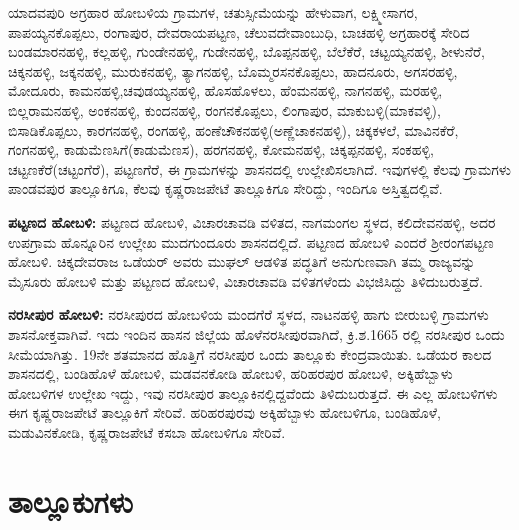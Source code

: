 ಯಾದವಪುರಿ ಅಗ್ರಹಾರ ಹೋಬಳಿಯ ಗ್ರಾಮಗಳ, ಚತುಸ್ಸೀಮೆಯನ್ನು ಹೇಳುವಾಗ, ಲಕ್ಷ್ಮೀಸಾಗರ, ಪಾಪಯ್ಯನ\-ಕೊಪ್ಪಲು, ರಂಗಾಪುರ, ದೇವರಾಯಪಟ್ಟಣ, ಚೆಲುವದೇವಾಂಬುಧಿ, ಬಾಚಹಳ್ಳಿ ಅಗ್ರಹಾರಕ್ಕೆ ಸೇರಿದ ಬಂಡಮಾರನಹಳ್ಳಿ, ಕಲ್ಲಹಳ್ಳಿ, ಗುಂಡೇನಹಳ್ಳಿ, ಗುಡೇನಹಳ್ಳಿ, ಬೊಪ್ಪನಹಳ್ಳಿ, ಬೆಲೆಕೆರೆ, ಚಟ್ಟಯ್ಯನಹಳ್ಳಿ, ಶೀಳುನೆರೆ, ಚಿಕ್ಕನಹಳ್ಳಿ, ಜಕ್ಕನಹಳ್ಳಿ, ಮುರುಕನಹಳ್ಳಿ, ತ್ಯಾಗನಹಳ್ಳಿ, ಬೊಮ್ಮರಸನಕೊಪ್ಪಲು, ಹಾದನೂರು, ಅಗಸರಹಳ್ಳಿ, ಮೋದೂರು, ಕಾಮನಹಳ್ಳಿ,\break ಚವುಡಯ್ಯನಹಳ್ಳಿ, ಹೊಸಹೊಳಲು, ಹೆಂಮನಹಳ್ಳಿ, ನಾಗನಹಳ್ಳಿ, ಮರಹಳ್ಳಿ, ಬಿಲ್ಲರಾಮನಹಳ್ಳಿ, ಅಂಕನಹಳ್ಳಿ, ಕುಂದನಹಳ್ಳಿ, ರಂಗನಕೊಪ್ಪಲು, ಲಿಂಗಾಪುರ, ಮಾಕುಬಳ್ಳಿ(ಮಾಕವಳ್ಳಿ), ಬಿಸಾಡಿಕೊಪ್ಪಲು, ಕಾರಗನಹಳ್ಳಿ, ರಂಗಹಳ್ಳಿ, ಹಂಣೆಚೌಕನ\-ಹಳ್ಳಿ\break (ಅಣ್ಣೆಚಾಕನಹಳ್ಳಿ), ಚಿಕ್ಕಕಳಲೆ, ಮಾವಿನಕೆರೆ, ಗಂಗನಹಳ್ಳಿ, ಕಾಡುಮೆಣಸಿಗೆ(ಕಾಡುಮೆಣಸ), ಹರಗನಹಳ್ಳಿ, ಕೋಮನಹಳ್ಳಿ, ಚಿಕ್ಕಪ್ಪನಹಳ್ಳಿ, ಸಂಕಹಳ್ಳಿ, ಚಟ್ಟಣಕೆರೆ(ಚಟ್ಟಂಗೆರೆ), ಪಟ್ಟಣಗೆರೆ, ಈ ಗ್ರಾಮಗಳನ್ನು ಶಾಸನದಲ್ಲಿ ಉಲ್ಲೇಖಿಸಲಾಗಿದೆ. ಇವುಗಳಲ್ಲಿ ಕೆಲವು ಗ್ರಾಮಗಳು ಪಾಂಡವಪುರ ತಾಲ್ಲೂಕಿಗೂ, ಕೆಲವು ಕೃಷ್ಣರಾಜಪೇಟೆ ತಾಲ್ಲೂಕಿಗೂ ಸೇರಿದ್ದು, ಇಂದಿಗೂ ಅಸ್ತಿತ್ವದಲ್ಲಿವೆ.

\textbf{ಪಟ್ಟಣದ ಹೋಬಳಿ:} ಪಟ್ಟಣದ ಹೋಬಳಿ, ವಿಚಾರಚಾವಡಿ ವಳಿತದ, ನಾಗಮಂಗಲ ಸ್ಥಳದ, ಕಲಿದೇವನಹಳ್ಳಿ, ಅದರ ಉಪಗ್ರಾಮ ಹೊನ್ನೂರಿನ ಉಲ್ಲೇಖ ಮುದಗುಂದೂರು ಶಾಸನದಲ್ಲಿದೆ. ಪಟ್ಟಣದ ಹೋಬಳಿ ಎಂದರೆ ಶ‍್ರೀರಂಗಪಟ್ಟಣ ಹೋಬಳಿ. ಚಿಕ್ಕದೇವರಾಜ ಒಡೆಯರ್​ ಅವರು ಮುಘಲ್​ ಆಡಳಿತ ಪದ್ಧತಿಗೆ ಅನುಗುಣವಾಗಿ ತಮ್ಮ ರಾಜ್ಯವನ್ನು ಮೈಸೂರು ಹೋಬಳಿ ಮತ್ತು ಪಟ್ಟಣದ ಹೋಬಳಿ, ವಿಚಾರಚಾವಡಿ ವಳಿತಗಳೆಂದು ವಿಭಜಿಸಿದ್ದು ತಿಳಿದುಬರುತ್ತದೆ.

\textbf{ನರಸೀಪುರ ಹೋಬಳಿ:} ನರಸೀಪುರದ ಹೋಬಳಿಯ ಮಂದಗೆರೆ ಸ್ಥಳದ, ನಾಟನಹಳ್ಳಿ ಹಾಗು ಬೀರುಬಳ್ಳಿ ಗ್ರಾಮಗಳು ಶಾಸನೋಕ್ತವಾಗಿವೆ. ಇದು ಇಂದಿನ ಹಾಸನ ಜಿಲ್ಲೆಯ ಹೊಳೆನರಸೀಪುರವಾಗಿದೆ, ಕ್ರಿ.ಶ.1665 ರಲ್ಲಿ ನರಸೀಪುರ ಒಂದು ಸೀಮೆಯಾಗಿತ್ತು. 19ನೇ ಶತಮಾನದ ಹೊತ್ತಿಗೆ ನರಸೀಪುರ ಒಂದು ತಾಲ್ಲೂಕು ಕೇಂದ್ರವಾಯಿತು. ಒಡೆಯರ ಕಾಲದ ಶಾಸನದಲ್ಲಿ, ಬಂಡಿಹೊಳೆ ಹೋಬಳಿ, ಮಡವನಕೋಡಿ ಹೋಬಳಿ, ಹರಿಹರಪುರ ಹೋಬಳಿ, ಅಕ್ಕಿಹೆಬ್ಬಾಳು ಹೋಬಳಿಗಳ ಉಲ್ಲೇಖ ಇದ್ದು, ಇವು ನರಸೀಪುರ ತಾಲ್ಲೂಕಿನಲ್ಲಿದ್ದವೆಂದು ತಿಳಿದುಬರುತ್ತದೆ. ಈ ಎಲ್ಲ ಹೋಬಳಿಗಳು ಈಗ ಕೃಷ್ಣರಾಜಪೇಟೆ ತಾಲ್ಲೂಕಿಗೆ ಸೇರಿವೆ. ಹರಿಹರಪುರವು ಅಕ್ಕಿಹೆಬ್ಬಾಳು ಹೋಬಳಿಗೂ, ಬಂಡಿಹೊಳೆ, ಮಡುವಿನಕೋಡಿ, ಕೃಷ್ಣರಾಜಪೇಟೆ ಕಸಬಾ ಹೋಬಳಿಗೂ ಸೇರಿವೆ.

\section*{ತಾಲ್ಲೂಕುಗಳು}

